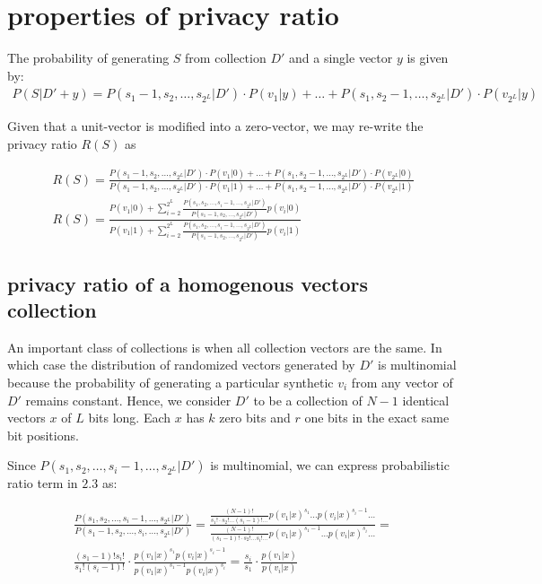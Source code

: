 \documentclass[11pt,draft]{article}
\begin{document}
\section{properties of privacy ratio}

The probability of generating $S$ from collection $D'$ and a single vector $y$ is given by:
\begin{align}
P(S|D'+y) = P(s_1-1,s_2,\dots,s_{2^L}|D') \cdot P(v_1|y) + \dots + P(s_1,s_2-1,\dots,s_{2^L}|D') \cdot P(v_{2^L}|y) 
\end{align}

Given that a unit-vector is modified into a zero-vector, we may re-write the privacy ratio $R(S)$ as

\begin{align}
R(S)= \frac{P(s_1-1,s_2,\dots,s_{2^L}|D') \cdot P(v_1|0) + \dots + P(s_1,s_2-1,\dots,s_{2^L}|D') \cdot P(v_{2^L}|0) }{P(s_1-1,s_2,\dots,s_{2^L}|D') \cdot P(v_1|1) + \dots + P(s_1,s_2-1,\dots,s_{2^L}|D') \cdot P(v_{2^L}|1)}\\
R(S) = \frac{ P(v_1|0)  + \sum_{i=2}^{2^L} \frac{P(s_1,s_2,\dots,s_i-1,\dots,s_{2^L}|D')}{P(s_1-1,s_2,\dots,s_{2^L}|D')} p(v_i|0)} {P(v_1|1)  + \sum_{i=2}^{2^L} \frac{P(s_1,s_2,\dots,s_i-1,\dots,s_{2^L}|D')}{P(s_1-1,s_2,\dots,s_{2^L}|D')} p(v_i|1)}
\end{align}

\subsection{privacy ratio of a homogenous vectors collection}
An important class of collections is when all collection vectors are the same. In which case the distribution of randomized vectors generated by $D'$ is multinomial because the probability of generating a particular synthetic $v_i$ from any vector of $D'$ remains constant.  Hence, we consider $D'$ to be a collection of $N-1$ identical vectors $x$ of $L$ bits long.  Each $x$ has $k$ zero bits and $r$ one bits in the exact same bit positions.

Since $P(s_1,s_2,\dots,s_i-1,\dots,s_{2^L}|D')$ is multinomial, we can express probabilistic ratio term in $2.3$ as:

\begin{align}
\frac{P(s_1,s_2,\dots,s_i-1,\dots,s_{2^L}|D')}{P(s_1-1,s_2,\dots,s_i,\dots,s_{2^L}|D')}  = \frac{ \frac{(N-1)!}{s_1!\cdot s_2! \dots (s_i-1)!\dots} p(v_1|x)^{s_1} \dots p(v_i|x)^{s_i-1} \dots  }{ \frac{(N-1)!}{(s_1-1)!\cdot s_2! \dots s_i!\dots} p(v_1|x)^{s_1-1} \dots p(v_i|x)^{s_i} \dots} = \\
\frac{(s_1-1)!s_i!}{s_1!(s_i-1)!} \cdot \frac{p(v_1|x)^{s_1} p(v_i|x)^{s_i-1} }{  p(v_1|x)^{s_1-1} p(v_i|x)^{s_i} } = \frac{s_i}{s_1} \cdot \frac{p(v_1|x)}{p(v_i|x)} 
 \end{align}
\end{document}
